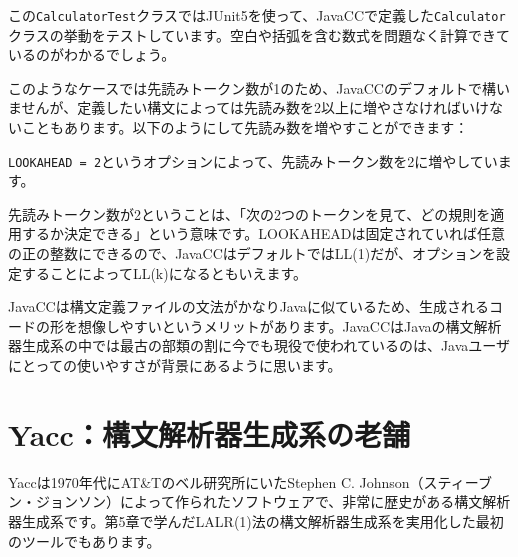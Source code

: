 この\texttt{CalculatorTest}クラスではJUnit5を使って、JavaCCで定義した\texttt{Calculator}クラスの挙動をテストしています。空白や括弧を含む数式を問題なく計算できているのがわかるでしょう。

このようなケースでは先読みトークン数が1のため、JavaCCのデフォルトで構いませんが、定義したい構文によっては先読み数を2以上に増やさなければいけないこともあります。以下のようにして先読み数を増やすことができます：

\begin{Shaded}
\begin{Highlighting}[]
\NormalTok{;}
\NormalTok{;}
\NormalTok{;}
\NormalTok{\}}
\end{Highlighting}
\end{Shaded}

\texttt{LOOKAHEAD\ =\ 2}というオプションによって、先読みトークン数を2に増やしています。

先読みトークン数が2ということは、「次の2つのトークンを見て、どの規則を適用するか決定できる」という意味です。LOOKAHEADは固定されていれば任意の正の整数にできるので、JavaCCはデフォルトではLL(1)だが、オプションを設定することによってLL(k)になるともいえます。

JavaCCは構文定義ファイルの文法がかなりJavaに似ているため、生成されるコードの形を想像しやすいというメリットがあります。JavaCCはJavaの構文解析器生成系の中では最古の部類の割に今でも現役で使われているのは、Javaユーザにとっての使いやすさが背景にあるように思います。

\hypertarget{chapter6-yaccux69cbux6587ux89e3ux6790ux5668ux751fux6210ux7cfbux306eux8001ux8217}{%
\section{Yacc：構文解析器生成系の老舗}\label{chapter6-yaccux69cbux6587ux89e3ux6790ux5668ux751fux6210ux7cfbux306eux8001ux8217}}

Yaccは1970年代にAT\&Tのベル研究所にいたStephen C.
Johnson（スティーブン・ジョンソン）によって作られたソフトウェアで、非常に歴史がある構文解析器生成系です。第5章で学んだLALR(1)法の構文解析器生成系を実用化した最初のツールでもあります。

